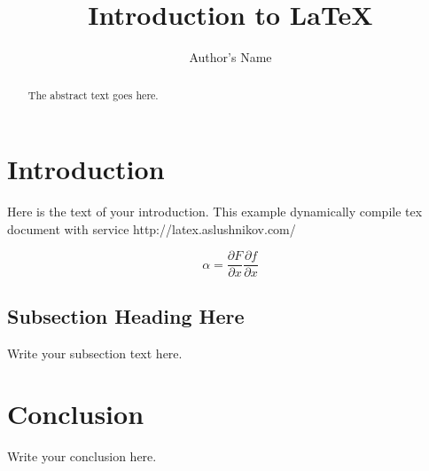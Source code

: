 \documentclass{article}
\begin{document}
\title{Introduction to \LaTeX{}}
\author{Author's Name}

\maketitle

\begin{abstract}
The abstract text goes here.
\end{abstract}

\section{Introduction}
Here is the text of your introduction.
This example dynamically compile tex document with service http://latex.aslushnikov.com/

\begin{equation}
    \label{simple_equation}
    \alpha = \frac{\partial F}{\partial x}\frac{\partial f}{\partial x}
\end{equation}

\subsection{Subsection Heading Here}
Write your subsection text here.

\section{Conclusion}
Write your conclusion here.
\end{document}
